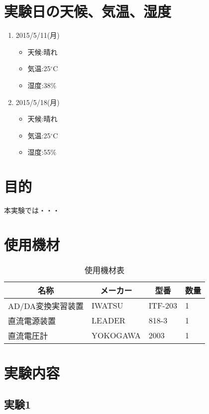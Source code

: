 \documentclass[10pt]{jsarticle}
\begin{document}
\section{実験日の天候、気温、湿度}
\begin{enumerate}
\item{2015/5/11(月)}
\begin{itemize}
\item{天候:晴れ}
\item{気温:25$^\circ$C}
\item{湿度:38\%}
\end{itemize}
\item{2015/5/18(月)}
\begin{itemize}
\item{天候:晴れ}
\item{気温:25$^\circ$C}
\item{湿度:55\%}
\end{itemize}
\end{enumerate}
\section{目的}
本実験では・・・
\section{使用機材}
\begin{table}[H]
\centering
\caption{使用機材表} \label{Equipments}
\begin{tabular}{|l|l|l|l|} 
\hline
\multicolumn{1}{|c|}{\textbf{名称}}&\multicolumn{1}{c|}{\textbf{メーカー}}&\multicolumn{1}{c|}{\textbf{型番}}&\multicolumn{1}{c|}{\textbf{数量}}\\\hline\hline
AD/DA変換実習装置&IWATSU&ITF-203&1\\\hline
直流電源装置&LEADER&818-3&1\\\hline
直流電圧計&YOKOGAWA&2003&1\\\hline
\end{tabular}
\end{table}

\newpage

\section{実験内容}
\subsection{実験1}
\end{document}

